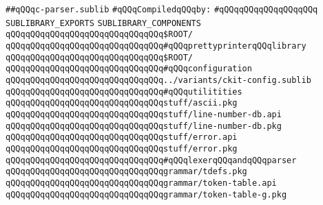 \label{src/lib/c-kit/src/parser/c-parser.sublib}
\verb|##qQQqc-parser.sublib|\newline
\newline
\verb|#qQQqCompiledqQQqby:|\newline
\verb|#qQQqqQQqqQQqqQQqqQQq|\newline
\newline
\verb|SUBLIBRARY_EXPORTS|\newline
\newline
\verb|SUBLIBRARY_COMPONENTS|\newline
\newline
\verb|qQQqqQQqqQQqqQQqqQQqqQQqqQQqqQQq$ROOT/|\newline
\newline
\verb|qQQqqQQqqQQqqQQqqQQqqQQqqQQqqQQq#qQQqprettyprinterqQQqlibrary|\newline
\verb|qQQqqQQqqQQqqQQqqQQqqQQqqQQqqQQq$ROOT/|\newline
\newline
\verb|qQQqqQQqqQQqqQQqqQQqqQQqqQQqqQQq#qQQqconfiguration|\newline
\verb|qQQqqQQqqQQqqQQqqQQqqQQqqQQqqQQq../variants/ckit-config.sublib|\newline
\newline
\verb|qQQqqQQqqQQqqQQqqQQqqQQqqQQqqQQq#qQQqutilitities|\newline
\verb|qQQqqQQqqQQqqQQqqQQqqQQqqQQqqQQqstuff/ascii.pkg|\newline
\verb|qQQqqQQqqQQqqQQqqQQqqQQqqQQqqQQqstuff/line-number-db.api|\newline
\verb|qQQqqQQqqQQqqQQqqQQqqQQqqQQqqQQqstuff/line-number-db.pkg|\newline
\verb|qQQqqQQqqQQqqQQqqQQqqQQqqQQqqQQqstuff/error.api|\newline
\verb|qQQqqQQqqQQqqQQqqQQqqQQqqQQqqQQqstuff/error.pkg|\newline
\newline
\verb|qQQqqQQqqQQqqQQqqQQqqQQqqQQqqQQq#qQQqlexerqQQqandqQQqparser|\newline
\verb|qQQqqQQqqQQqqQQqqQQqqQQqqQQqqQQqgrammar/tdefs.pkg|\newline
\verb|qQQqqQQqqQQqqQQqqQQqqQQqqQQqqQQqgrammar/token-table.api|\newline
\verb|qQQqqQQqqQQqqQQqqQQqqQQqqQQqqQQqgrammar/token-table-g.pkg|\newline
